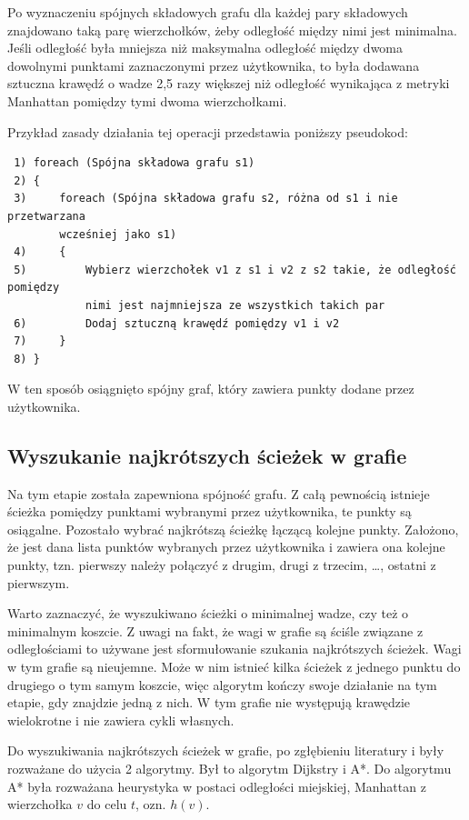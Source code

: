 \documentclass[a4paper,11pt,twoside,openright]{report}
\theoremstyle{definition}
\begin{document}
Po wyznaczeniu spójnych składowych grafu dla każdej pary składowych znajdowano
taką parę wierzchołków, żeby odległość między nimi jest minimalna. Jeśli odległość
była mniejsza niż maksymalna odległość między dwoma dowolnymi punktami zaznaczonymi
przez użytkownika, to była dodawana sztuczna krawędź o wadze 2,5 razy większej
niż odległość wynikająca z metryki Manhattan pomiędzy tymi dwoma wierzchołkami.

Przykład zasady działania tej operacji przedstawia poniższy pseudokod:

\begin{verbatim}
 1) foreach (Spójna składowa grafu s1)
 2) {
 3)     foreach (Spójna składowa grafu s2, różna od s1 i nie przetwarzana
        wcześniej jako s1)
 4)     {
 5)         Wybierz wierzchołek v1 z s1 i v2 z s2 takie, że odległość pomiędzy
            nimi jest najmniejsza ze wszystkich takich par
 6)         Dodaj sztuczną krawędź pomiędzy v1 i v2
 7)     }
 8) }
\end{verbatim}


W ten sposób osiągnięto spójny graf, który zawiera punkty dodane przez użytkownika.

\subsection {Wyszukanie najkrótszych ścieżek w grafie}

Na tym etapie została zapewniona spójność grafu. Z całą pewnością istnieje ścieżka
pomiędzy punktami wybranymi przez użytkownika, te punkty są osiągalne. Pozostało
wybrać najkrótszą ścieżkę łączącą kolejne punkty. Założono, że jest dana lista
punktów wybranych przez użytkownika i zawiera ona kolejne punkty, tzn. pierwszy
należy połączyć z drugim, drugi z trzecim, \dots, ostatni z pierwszym.

Warto zaznaczyć, że wyszukiwano ścieżki o minimalnej wadze, czy też o minimalnym
koszcie. Z uwagi na fakt, że wagi w grafie są ściśle związane z odległościami to
używane jest sformułowanie szukania najkrótszych ścieżek. Wagi w tym grafie są
nieujemne. Może w nim istnieć kilka ścieżek z jednego punktu do drugiego o tym
samym koszcie, więc algorytm kończy swoje działanie na tym etapie, gdy znajdzie
jedną z nich. W tym grafie nie występują krawędzie wielokrotne i nie zawiera
cykli własnych.

Do wyszukiwania najkrótszych ścieżek w grafie, po zgłębieniu literatury
\cite{Algorytmy Sedgewick} i \cite{AiSD2} były rozważane do użycia 2 algorytmy.
Był to algorytm Dijkstry i A*. Do algorytmu A* była rozważana heurystyka w postaci
odległości miejskiej, Manhattan z wierzchołka $v$ do celu $t$, ozn. $h(v)$.
\end{document}

